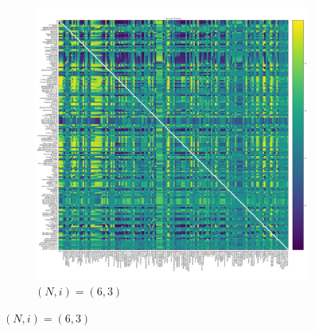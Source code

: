\documentclass{article}
\begin{document}
\begin{figure}[!hbtp]
    ~
    \begin{subfigure}[t]{.3\textwidth}
        \centering
        \includegraphics[width=.8\textwidth]{../img/fixation_heatmap_6_3_noise.pdf}
        \caption{\((N,i)=(6, 3)\)}
    \end{subfigure}%


\end{figure}
\end{document}
